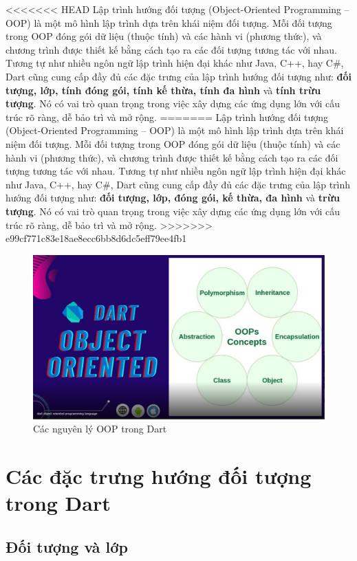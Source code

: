 \documentclass[../DoAn.tex]{subfiles}
\numberwithin{figure}{chapter}
\begin{document}
<<<<<<< HEAD
Lập trình hướng đối tượng (Object-Oriented Programming – OOP) là một mô hình lập trình dựa trên khái niệm đối tượng.  Mỗi đối tượng trong OOP đóng gói dữ liệu (thuộc tính) và các hành vi (phương thức), và chương trình được thiết kế bằng cách tạo ra các đối tượng tương tác với nhau.  Tương tự như nhiều ngôn ngữ lập trình hiện đại khác như Java, C++, hay C\#, Dart cũng cung cấp đầy đủ các đặc trưng của lập trình hướng đối tượng như: \textbf{đối tượng, lớp, tính đóng gói, tính kế thừa, tính đa hình} và \textbf{tính trừu tượng}. Nó có vai trò quan trọng trong việc xây dựng các ứng dụng lớn với cấu trúc rõ ràng, dễ bảo trì và mở rộng.
=======
Lập trình hướng đối tượng (Object-Oriented Programming – OOP) là một mô hình lập trình dựa trên khái niệm đối tượng.  Mỗi đối tượng trong OOP đóng gói dữ liệu (thuộc tính) và các hành vi (phương thức), và chương trình được thiết kế bằng cách tạo ra các đối tượng tương tác với nhau.  Tương tự như nhiều ngôn ngữ lập trình hiện đại khác như Java, C++, hay C\#, Dart cũng cung cấp đầy đủ các đặc trưng của lập trình hướng đối tượng như: \textbf{đối tượng, lớp, đóng gói, kế thừa, đa hình} và \textbf{trừu tượng}. Nó có vai trò quan trọng trong việc xây dựng các ứng dụng lớn với cấu trúc rõ ràng, dễ bảo trì và mở rộng.
>>>>>>> e99cf771c83e18ae8ecc6bb8d6dc5eff79ee4fb1

\begin{figure}[H]
    \centering
    \includegraphics[width=1\textwidth]{Hinhve/oopInDart.png}
    \caption{Các nguyên lý OOP trong Dart}
    \label{fig:oopindart}
\end{figure}

\section{Các đặc trưng hướng đối tượng trong Dart}
\subsection{Đối tượng và lớp}
\end{document}
